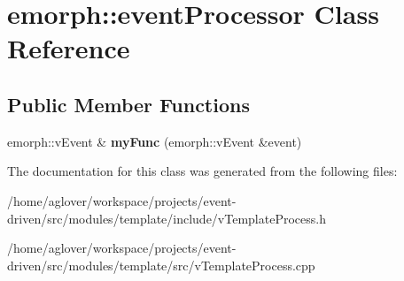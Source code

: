 \hypertarget{classemorph_1_1eventProcessor}{}\section{emorph\+:\+:event\+Processor Class Reference}
\label{classemorph_1_1eventProcessor}
\subsection*{Public Member Functions}
\begin{DoxyCompactItemize}
\item 
emorph\+::v\+Event \& {\bfseries my\+Func} (emorph\+::v\+Event \&event)\hypertarget{classemorph_1_1eventProcessor_a333c21041a0998eb2739900a0eb75752}{}\label{classemorph_1_1eventProcessor_a333c21041a0998eb2739900a0eb75752}

\end{DoxyCompactItemize}


The documentation for this class was generated from the following files\+:\begin{DoxyCompactItemize}
\item 
/home/aglover/workspace/projects/event-\/driven/src/modules/template/include/v\+Template\+Process.\+h\item 
/home/aglover/workspace/projects/event-\/driven/src/modules/template/src/v\+Template\+Process.\+cpp\end{DoxyCompactItemize}
